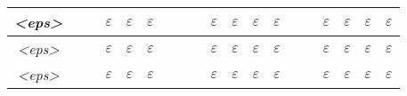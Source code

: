 \documentclass[10pt,twoside,a4paper]{memoir}
\begin{document}
\begin{center}
\begin{tabular}{ |c||c|c|c|c|c|c|c|c|c|c|c|c|c|c|c|c|c|c| }
\textsl{\textless eps\textgreater} &  &  & $\varepsilon$ & $\varepsilon$ & $\varepsilon$ &  &  &  & $\varepsilon$ & $\varepsilon$ & $\varepsilon$ & $\varepsilon$ &  &  & $\varepsilon$ & $\varepsilon$ & $\varepsilon$ & $\varepsilon$\\ \hline
\textsl{\textless eps\textgreater} &  &  & $\varepsilon$ & $\varepsilon$ & $\varepsilon$ &  &  &  & $\varepsilon$ & $\varepsilon$ & $\varepsilon$ & $\varepsilon$ &  &  & $\varepsilon$ & $\varepsilon$ & $\varepsilon$ & $\varepsilon$\\ \hline
\textsl{\textless eps\textgreater} &  &  & $\varepsilon$ & $\varepsilon$ & $\varepsilon$ &  &  &  & $\varepsilon$ & $\varepsilon$ & $\varepsilon$ & $\varepsilon$ &  &  & $\varepsilon$ & $\varepsilon$ & $\varepsilon$ & $\varepsilon$\\
\hline
\end{tabular}

\end{center}
\end{document}
